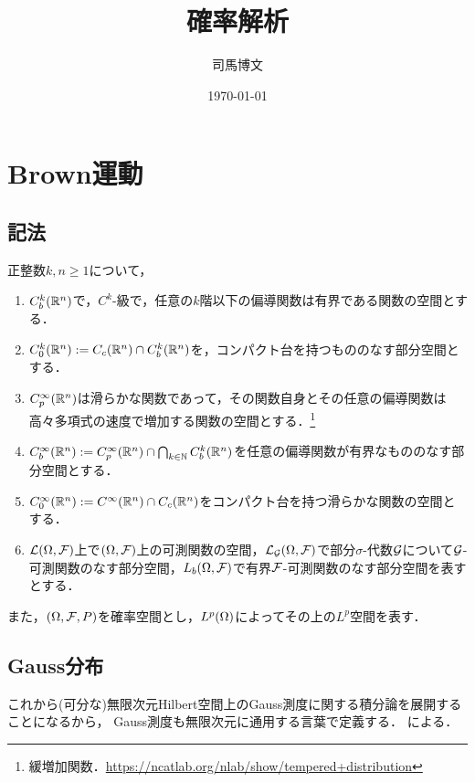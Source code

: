 \documentclass[uplatex,dvipdfmx]{jsreport}
\title{確率解析}
\author{司馬博文}
\date{\today}
\begin{document}
\tableofcontents

\chapter{Brown運動}



\section{記法}

\begin{notation}
    正整数$k,n\ge1$について，
    \begin{enumerate}
        \item $C_b^k(\mathbb{R}^n)$で，$C^k$-級で，任意の$k$階以下の偏導関数は有界である関数の空間とする．
        \item $C_0^k(\mathbb{R}^n):=C_c(\mathbb{R}^n)\cap C_b^k(\mathbb{R}^n)$を，コンパクト台を持つもののなす部分空間とする．
        \item $C_p^\infty(\mathbb{R}^n)$は滑らかな関数であって，その関数自身とその任意の偏導関数は高々多項式の速度で増加する関数の空間とする．\footnote{緩増加関数．\url{https://ncatlab.org/nlab/show/tempered+distribution}}
        \item $C_b^\infty(\mathbb{R}^n):=C_p^\infty(\mathbb{R}^n)\cap\bigcap_{k\in\mathbb{N}}C_b^k(\mathbb{R}^n)$を任意の偏導関数が有界なもののなす部分空間とする．
        \item $C_0^\infty(\mathbb{R}^n):=C^\infty(\mathbb{R}^n)\cap C_c(\mathbb{R}^n)$をコンパクト台を持つ滑らかな関数の空間とする．
        \item $\mathcal{L}(\Omega,\mathcal{F})$上で$(\Omega,\mathcal{F})$上の可測関数の空間，$\mathcal{L}_{\mathcal{G}}(\Omega,\mathcal{F})$で部分$\sigma$-代数$\mathcal{G}$について$\mathcal{G}$-可測関数のなす部分空間，$L_b(\Omega,\mathcal{F})$で有界$\mathcal{F}$-可測関数のなす部分空間を表すとする．
    \end{enumerate}
    また，$(\Omega,\mathcal{F},P)$を確率空間とし，$L^p(\Omega)$によってその上の$L^p$空間を表す．
\end{notation}

\section{Gauss分布}

\begin{tcolorbox}[colframe=ForestGreen, colback=ForestGreen!10!white,breakable,colbacktitle=ForestGreen!40!white,coltitle=black,fonttitle=\bfseries\sffamily,
title=]
    これから(可分な)無限次元Hilbert空間上のGauss測度に関する積分論を展開することになるから，
    Gauss測度も無限次元に通用する言葉で定義する．
    \cite{Prato}による．
\end{tcolorbox}
\end{document}
